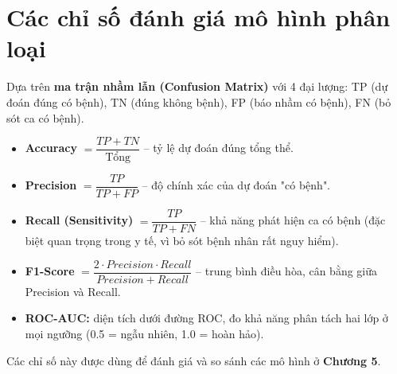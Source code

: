\section{Các chỉ số đánh giá mô hình phân loại}
Dựa trên \textbf{ma trận nhầm lẫn (Confusion Matrix)} với 4 đại lượng: TP (dự
đoán đúng có bệnh), TN (đúng không bệnh), FP (báo nhầm có bệnh), FN (bỏ sót ca
có bệnh).
\begin{itemize}
  \item \textbf{Accuracy} $= \dfrac{TP + TN}{\text{Tổng}}$ -- tỷ lệ dự đoán đúng
        tổng thể.
  \item \textbf{Precision} $= \dfrac{TP}{TP + FP}$ -- độ chính xác của dự đoán
        "có bệnh".
  \item \textbf{Recall (Sensitivity)} $= \dfrac{TP}{TP + FN}$ -- khả năng phát
        hiện ca có bệnh (đặc biệt quan trọng trong y tế, vì bỏ sót bệnh nhân rất
        nguy hiểm).
  \item \textbf{F1-Score} $= \dfrac{2 \cdot Precision \cdot Recall}{Precision +
        Recall}$ -- trung bình điều hòa, cân bằng giữa Precision và Recall.
  \item \textbf{ROC-AUC:} diện tích dưới đường ROC, đo khả năng phân tách hai
        lớp ở mọi ngưỡng (0.5 = ngẫu nhiên, 1.0 = hoàn hảo).
\end{itemize}
Các chỉ số này được dùng để đánh giá và so sánh các mô hình ở \textbf{Chương 5}.
